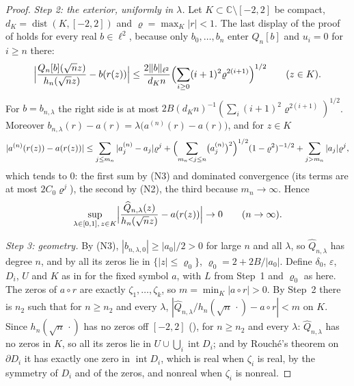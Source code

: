 \documentclass[11pt]{amsart}
\theoremstyle{definition}
\theoremstyle{remark}
\numberwithin{equation}{section}
\newcommand{\C}{\mathbb{C}}
\newcommand{\eps}{\varepsilon}
\DeclareMathOperator{\dist}{dist}
\begin{document}
\begin{proof}
\emph{Step 2: the exterior, uniformly in $\lambda$.} Let $K\subset\C\setminus[-2,2]$ be compact, $d_K=\dist(K,[-2,2])$ and $\varrho=\max_K|r|<1$. The last display of the proof of \cite[Proposition~\ref{M-prop:exterior}]{Main} holds for every real $b\in\ell^2$, because only $b_0,\dots,b_n$ enter $Q_n[b]$ and $u_i=0$ for $i\ge n$ there:
\[
\Bigl|\frac{Q_n[b](\sqrt nz)}{h_n(\sqrt nz)}-b(r(z))\Bigr|\le\frac{2\|b\|_{\ell^2}}{d_Kn}\Bigl(\sum_{i\ge0}(i+1)^2\varrho^{2(i+1)}\Bigr)^{1/2}\qquad(z\in K).
\]
For $b=b_{n,\lambda}$ the right side is at most $2B(d_Kn)^{-1}(\sum_i(i+1)^2\varrho^{2(i+1)})^{1/2}$. Moreover $b_{n,\lambda}(r)-a(r)=\lambda\bigl(a^{(n)}(r)-a(r)\bigr)$, and for $z\in K$
\[
|a^{(n)}(r(z))-a(r(z))|\le\sum_{j\le m_n}|a^{(n)}_j-a_j|\varrho^j+\Bigl(\sum_{m_n<j\le n}\bigl(a^{(n)}_j\bigr)^2\Bigr)^{1/2}(1-\varrho^2)^{-1/2}+\sum_{j>m_n}|a_j|\varrho^j ,
\]
which tends to $0$: the first sum by (N3) and dominated convergence (its terms are at most $2C_0\varrho^j$), the second by (N2), the third because $m_n\to\infty$. Hence
\[
\sup_{\lambda\in[0,1],\,z\in K}\Bigl|\frac{\widehat Q_{n,\lambda}(z)}{h_n(\sqrt nz)}-a(r(z))\Bigr|\to0\qquad(n\to\infty).
\]

\emph{Step 3: geometry.} By (N3), $|b_{n,\lambda,0}|\ge|a_0|/2>0$ for large $n$ and all $\lambda$, so $\widehat Q_{n,\lambda}$ has degree $n$, and by \cite[Lemma~\ref{M-lem:colleague}]{Main} all its zeros lie in $\{|z|\le\varrho_0\}$, $\varrho_0=2+2B/|a_0|$. Define $\delta_0$, $\eps$, $D_i$, $U$ and $K$ as in \cite[Section~\ref{M-sec:proof}]{Main} for the fixed symbol $a$, with $L$ from Step~1 and $\varrho_0$ as here. The zeros of $a\circ r$ are exactly $\zeta_1,\dots,\zeta_k$, so $m=\min_K|a\circ r|>0$. By Step~2 there is $n_2$ such that for $n\ge n_2$ and every $\lambda$, $|\widehat Q_{n,\lambda}/h_n(\sqrt n\,\cdot)-a\circ r|<m$ on $K$. Since $h_n(\sqrt n\,\cdot)$ has no zeros off $[-2,2]$ (\cite[Lemma~\ref{M-lem:resolvent}]{Main}), for $n\ge n_2$ and every $\lambda$: $\widehat Q_{n,\lambda}$ has no zeros in $K$, so all its zeros lie in $U\cup\bigcup_i\operatorname{int}D_i$; and by Rouch\'e's theorem on $\partial D_i$ it has exactly one zero in $\operatorname{int}D_i$, which is real when $\zeta_i$ is real, by the symmetry of $D_i$ and of the zeros, and nonreal when $\zeta_i$ is nonreal.


\end{proof}
\end{document}
